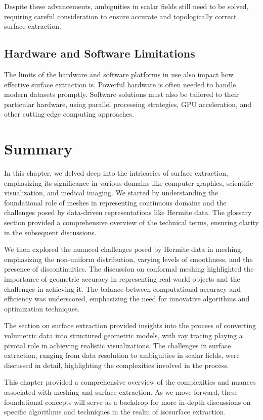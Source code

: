 Despite these advancements, ambiguities in scalar fields still need to be solved, requiring careful consideration to ensure accurate and topologically correct surface extraction.

\subsection{Hardware and Software Limitations}
The limits of the hardware and software platforms in use also impact how effective surface extraction is. Powerful hardware is often needed to handle modern datasets promptly. Software solutions must also be tailored to their particular hardware, using parallel processing strategies, GPU acceleration, and other cutting-edge computing approaches.

\section{Summary}
In this chapter, we delved deep into the intricacies of surface extraction, emphasizing its significance in various domains like computer graphics, scientific visualization, and medical imaging. We started by understanding the foundational role of meshes in representing continuous domains and the challenges posed by data-driven representations like Hermite data. The glossary section provided a comprehensive overview of the technical terms, ensuring clarity in the subsequent discussions.

We then explored the nuanced challenges posed by Hermite data in meshing, emphasizing the non-uniform distribution, varying levels of smoothness, and the presence of discontinuities. The discussion on conformal meshing highlighted the importance of geometric accuracy in representing real-world objects and the challenges in achieving it. The balance between computational accuracy and efficiency was underscored, emphasizing the need for innovative algorithms and optimization techniques.

The section on surface extraction provided insights into the process of converting volumetric data into structured geometric models, with ray tracing playing a pivotal role in achieving realistic visualizations. The challenges in surface extraction, ranging from data resolution to ambiguities in scalar fields, were discussed in detail, highlighting the complexities involved in the process.

This chapter provided a comprehensive overview of the complexities and nuances associated with meshing and surface extraction. As we move forward, these foundational concepts will serve as a backdrop for more in-depth discussions on specific algorithms and techniques in the realm of isosurface extraction.